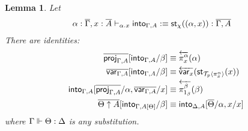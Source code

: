 \documentclass[10pt]{article}
\newtheorem{lemma}{Lemma}
\theoremstyle{definition}
\newcommand{\yields}{\vdash}
\newcommand{\rewrite}[2]{\overleftarrow{#1}(#2)}
\newcommand\StI[2]{\ensuremath{\mathsf{st}_{#1}(#2)}}
\newcommand\ApEl[2]{\mathcal{T}_{#1}\langle#2\rangle}
\begin{document}
\begin{lemma}
Let 
\begin{align*}
\alpha : \upstairs{\Gamma}, x : \upstairs{A} &\yields_{\alpha.x} \into{\Gamma, A} :\equiv \StI{\chi}{(\alpha, x)} : \upstairs{\Gamma, A}
\end{align*}
There are identities:
\begin{align*}
\upstairs{\proj{\Gamma, A}}[\into{\Gamma, A}/\beta] &\equiv \rewrite{\pi^\alpha_x}{\alpha} \\
\upstairs{\var{\Gamma, A}}[\into{\Gamma, A}/\beta] &\equiv \rewrite{\var{x}}{\StI{\ApEl{p}{\pi^{\alpha}_x}}{x}} \\
\into{\Gamma, A}[\upstairs{\proj{\Gamma, A}}/\alpha, \upstairs{\var{\Gamma, A}}/x]&\equiv \rewrite{\pi^\beta_{1_\beta}}{\beta} \\
\upstairs{\Theta \uparrow A}[\into{\Gamma, A[\Theta]}/\beta] &\equiv \into{\Delta, A}[\upstairs{\Theta}/\alpha, x / x]
\end{align*}
where $\Gamma \Vdash \Theta : \Delta$ is any substitution.
\end{lemma}
\end{document}
